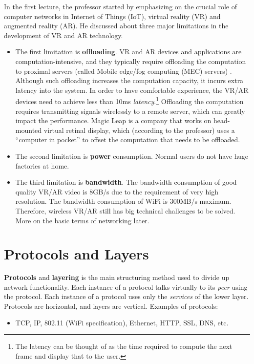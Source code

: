 \documentclass[12pt]{article}
\title{}
\begin{document}
\pagestyle{fancy}
\fancyhf{} %
\cfoot{\thepage}
\renewcommand{\headrulewidth}{1pt}

In the first lecture, the professor started by emphasizing on the crucial role of computer networks in Internet of Things (IoT), virtual reality (VR) and augmented reality (AR). He discussed about three major limitations in the development of VR and AR technology.
\begin{itemize}
\item The first limitation is \textbf{offloading}. VR and AR devices and applications are computation-intensive, and they typically require offloading the computation to proximal servers (called Mobile edge/fog computing (MEC) servers) \cite{liu2017latency}. Although such offloading increases the computation capacity, it incurs extra latency into the system. In order to have comfortable experience, the VR/AR devices need to achieve less than 10ms \emph{latency}.\footnote{The latency can be thought of as the time required to compute the next frame and display that to the user.} Offloading the computation requires transmitting signals wirelessly to a remote server, which can greatly impact the performance. Magic Leap is a company that works on head-mounted virtual retinal display, which (according to the professor) uses a ``computer in pocket'' to offset the computation that needs to be offloaded.
\item The second limitation is \textbf{power} consumption. Normal users do not have huge factories at home.
\item The third limitation is \textbf{bandwidth}. The bandwidth consumption of good quality VR/AR video is 8GB/s due to the requirement of very high resolution. The bandwidth consumption of WiFi is 300MB/s maximum. Therefore, wireless VR/AR still has big technical challenges to be solved. More on the basic terms of networking later.
\end{itemize}

\section{Protocols and Layers}

\textbf{Protocols} and \textbf{layering} is the main structuring method used to divide up network functionality. Each instance of a protocol talks virtually to its \emph{peer} using the protocol. Each instance of a protocol uses only the \emph{services} of the lower layer. Protocols are horizontal, and layers are vertical. Examples of protocols:
\begin{itemize}
  \item TCP, IP, 802.11 (WiFi specification), Ethernet, HTTP, SSL, DNS, etc.
\end{itemize}
\end{document}
